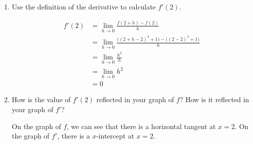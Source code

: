\documentclass{article}
\begin{document}
\begin{enumerate}[resume]
\begin{enumerate}
    \begin{solution}
    Since $f$ is always increasing, $f'$ should be positive except at $x=2$, where there is
    a horizontal tangent. At $x=2$, $f'$ should be zero. Since $f$ is concave down when $x<2$ and
    concave up when $x>2$, $f'$ should be decreasing when $x<2$ and increasing when $x>2$. 
      \begin{center}
      \end{center}
    \end{solution}

  \item
    \begin{problem}[\stretch{1.75}]
      Use the definition of the derivative to calculate $f'(2)$.
    \end{problem}

    \begin{solution}
      \begin{align*}
        f'(2) &= \lim_{h \to 0} \frac{f(2+h) - f(2)}{h} \\
        &= \lim_{h \to 0} \frac{\bigl((2+h-2)^3 +1\bigr) - \bigl((2-2)^3 +1 \bigr)}{h} \\
        &= \lim_{h \to 0} \frac{h^3}{h} \\
        &= \lim_{h \to 0} h^2 \\
        &= \boxed{0}
      \end{align*}
    \end{solution}

  \item
    \begin{problem}[\stretch{0.25}]
      How is the value of $f'(2)$ reflected in your graph of $f$? How is it reflected in your graph of $f'$? 
    \end{problem}

    \begin{solution}
      On the graph of $f$, we can see that there is a horizontal tangent at $x=2$. On the graph of $f'$, there
      is a $x$-intercept at $x=2$. 
    \end{solution}

  \end{enumerate}

\end{enumerate}
\end{document}
